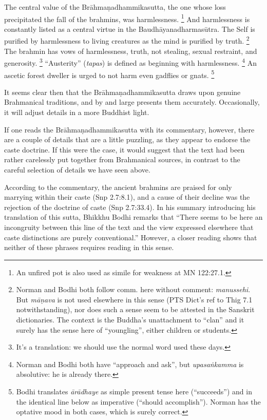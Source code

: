 \documentclass[12pt,openany]{book}%
\begin{document}
The central value of the \textsanskrit{Brāhmaṇadhammikasutta}, the one whose loss precipitated the fall of the brahmins, was harmlessness. \footnote{An unfired pot is also used as simile for weakness at MN 122:27.1. } And harmlessness is constantly listed as a central virtue in the \textsanskrit{Baudhāyanadharmasūtra}. The Self is purified by harmlessness to living creatures as the mind is purified by truth. \footnote{Norman and Bodhi both follow comm. here without comment: \textit{manussehi}. But \textit{\textsanskrit{māṇava}} is not used elsewhere in this sense (PTS Dict’s ref to Thig 7.1 notwithstanding), nor does such a sense seem to be attested in the Sanskrit dictionaries. The context is the Buddha’s unattachment to “clan” and it surely has the sense here of “youngling”, either children or students. } The brahmin has vows of harmlessness, truth, not stealing, sexual restraint, and generosity. \footnote{It’s a translation: we should use the normal word used these days. } “Austerity” (\textit{tapas}) is defined as beginning with harmlessness. \footnote{Norman and Bodhi both have “approach and ask”, but \textit{\textsanskrit{upasaṅkamma}} is absolutive: he is already there. } An ascetic forest dweller is urged to not harm even gadflies or gnats. \footnote{Bodhi translates \textit{\textsanskrit{ārādhaye}} as simple present tense here (“succeeds”) and in the identical line below as imperative (“should accomplish”). Norman has the optative mood in both cases, which is surely correct. }

It seems clear then that the \textsanskrit{Brāhmaṇadhammikasutta} draws upon genuine Brahmanical traditions, and by and large presents them accurately. Occasionally, it will adjust details in a more Buddhist light.

If one reads the \textsanskrit{Brāhmaṇadhammikasutta} with its commentary, however, there are a couple of details that are a little puzzling, as they appear to endorse the caste doctrine. If this were the case, it would suggest that the text had been rather carelessly put together from Brahmanical sources, in contrast to the careful selection of details we have seen above.

According to the commentary, the ancient brahmins are praised for only marrying within their caste (Snp 2.7:8.1), and a cause of their decline was the rejection of the doctrine of caste (Snp 2.7:33.4). In his summary introducing his translation of this sutta, Bhikkhu Bodhi remarks that “There seems to be here an incongruity between this line of the text and the view expressed elsewhere that caste distinctions are purely conventional.” However, a closer reading shows that neither of these phrases requires reading in this sense.
\end{document}
